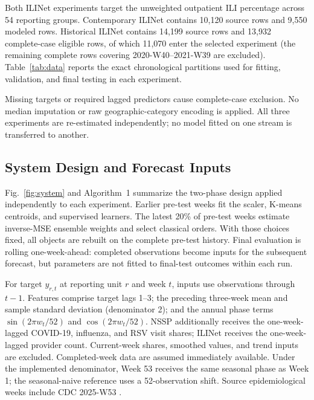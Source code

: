 \documentclass[conference,a4paper]{IEEEtran}
\begin{document}
Both ILINet experiments target the unweighted outpatient ILI percentage across 54 reporting groups. Contemporary ILINet contains 10,120 source rows and 9,550 modeled rows. Historical ILINet contains 14,199 source rows and 13,932 complete-case eligible rows, of which 11,070 enter the selected experiment (the remaining complete rows covering 2020-W40--2021-W39 are excluded). Table~\ref{tab:data} reports the exact chronological partitions used for fitting, validation, and final testing in each experiment.

Missing targets or required lagged predictors cause complete-case exclusion. No median imputation or raw geographic-category encoding is applied. All three experiments are re-estimated independently; no model fitted on one stream is transferred to another.

\begin{table}[t]

\end{table}

\subsection{System Design and Forecast Inputs}
Fig.~\ref{fig:system} and Algorithm~1 summarize the two-phase design applied independently to each experiment. Earlier pre-test weeks fit the scaler, K-means centroids, and supervised learners. The latest 20\% of pre-test weeks estimate inverse-MSE ensemble weights and select classical orders. With those choices fixed, all objects are rebuilt on the complete pre-test history. Final evaluation is rolling one-week-ahead: completed observations become inputs for the subsequent forecast, but parameters are not fitted to final-test outcomes within each run.

\begin{figure}[t]

\end{figure}

For target $y_{r,t}$ at reporting unit $r$ and week $t$, inputs use observations through $t-1$. Features comprise target lags 1--3; the preceding three-week mean and sample standard deviation (denominator 2); and the annual phase terms $\sin(2\pi w_t/52)$ and $\cos(2\pi w_t/52)$. NSSP additionally receives the one-week-lagged COVID-19, influenza, and RSV visit shares; ILINet receives the one-week-lagged provider count. Current-week shares, smoothed values, and trend inputs are excluded. Completed-week data are assumed immediately available. Under the implemented denominator, Week 53 receives the same seasonal phase as Week 1; the seasonal-naive reference uses a 52-observation shift. Source epidemiological weeks include CDC 2025-W53 \cite{week53}.
\end{document}
